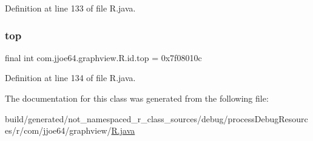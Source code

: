 Definition at line 133 of file R.\+java.

\mbox{\label{classcom_1_1jjoe64_1_1graphview_1_1_r_1_1id_ad99b3597dff3c7e3509265fbf6333241}} 
\subsubsection{\texorpdfstring{top}{top}}
{\footnotesize\ttfamily final int com.\+jjoe64.\+graphview.\+R.\+id.\+top = 0x7f08010c\hspace{0.3cm}{\ttfamily [static]}}



Definition at line 134 of file R.\+java.



The documentation for this class was generated from the following file\+:\begin{DoxyCompactItemize}
\item 
build/generated/not\+\_\+namespaced\+\_\+r\+\_\+class\+\_\+sources/debug/process\+Debug\+Resources/r/com/jjoe64/graphview/\mbox{\hyperlink{com_2jjoe64_2graphview_2_r_8java}{R.\+java}}\end{DoxyCompactItemize}
